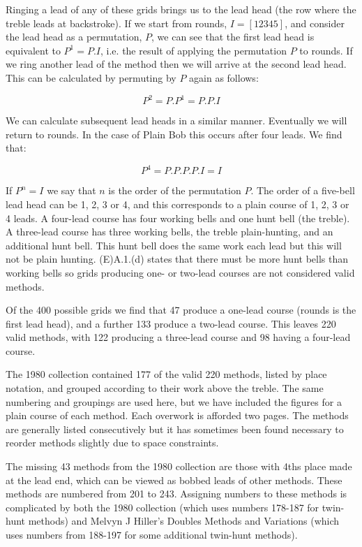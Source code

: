 Ringing a lead of any of these grids brings us to the lead head
(the row where the treble leads at backstroke).
If we start from rounds, \(I = [12345]\),
and consider the lead head as a permutation, \(P\),
we can see that the first lead head is equivalent to \(P^1 = P.I\),
i.e. the result of applying the permutation \(P\) to rounds.
If we ring another lead of the method then we will arrive at the second lead
head.
This can be calculated by permuting by \(P\) again as follows:

\begin{equation}
P^2 = P.P^1 = P.P.I
\end{equation}

We can calculate subsequent lead heads in a similar manner.
Eventually we will return to rounds.
In the case of Plain Bob this occurs after four leads.
We find that:

\begin{equation}
P^4 = P.P.P.P.I = I
\end{equation}

If \(P^n = I\) we say that \(n\) is the order of the permutation \(P\).
The order of a five-bell lead head can be 1, 2, 3 or 4,
and this corresponds to a plain course of 1, 2, 3 or 4 leads.
A four-lead course has four working bells and one hunt bell (the treble).
A three-lead course has three working bells, the treble plain-hunting,
and an additional hunt bell.
This hunt bell does the same work each lead but this will not be plain hunting.
(E)A.1.(d) states that there must be more hunt bells than working bells so grids
producing one- or two-lead courses are not considered valid methods.

Of the 400 possible grids we find that 47 produce a one-lead course
(rounds is the first lead head),
and a further 133 produce a two-lead course.
This leaves 220 valid methods,
with 122 producing a three-lead course and 98 having a four-lead course.

The 1980 collection contained 177 of the valid 220 methods,
listed by place notation, and grouped according to their work above the treble.
The same numbering and groupings are used here, but we have included the figures
for a plain course of each method.
Each overwork is afforded two pages.
The methods are generally listed consecutively but it has sometimes been found
necessary to reorder methods slightly due to space constraints.

The missing 43 methods from the 1980 collection are those with 4ths place made
at the lead end, which can be viewed as bobbed leads of other methods.
These methods are numbered from 201 to 243.
Assigning numbers to these methods is complicated by both the 1980 collection
(which uses numbers 178-187 for twin-hunt methods)
and Melvyn J Hiller’s Doubles Methods and Variations
(which uses numbers from 188-197 for some additional twin-hunt methods).

